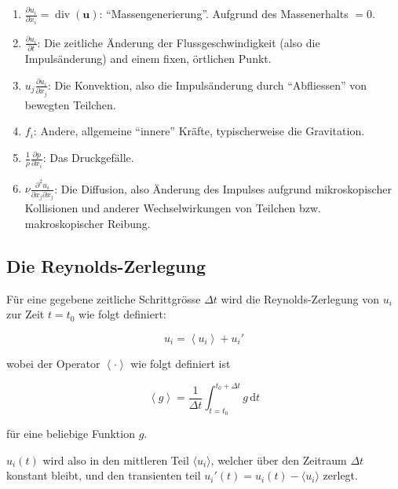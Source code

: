 \begin{enumerate}
    \item $\frac{\partial u_i}{\partial x_i} = \operatorname{div}(\mathbf{u})$: ``Massengenerierung''.
    Aufgrund des Massenerhalts $ = 0$.
    \item $\frac{\partial u_i}{\partial t}$: Die zeitliche Änderung der Flussgeschwindigkeit (also die 
        Impulsänderung) and einem fixen, örtlichen Punkt.
    \item $u_j \frac{\partial u_i}{\partial x_j}$: Die Konvektion, also die Impulsänderung durch ``Abfliessen''
        von bewegten Teilchen.
    \item $f_i$: Andere, allgemeine ``innere'' Kräfte, typischerweise die Gravitation.
    \item $\frac{1}{\rho} \frac{\partial p}{\partial x_i}$: Das Druckgefälle.
    \item $\nu \frac{\partial^2 u_i}{\partial x_j \partial x_j}$: Die Diffusion, also Änderung des Impulses
        aufgrund mikroskopischer Kollisionen und anderer Wechselwirkungen von Teilchen bzw.
        makroskopischer Reibung. %
\end{enumerate}

\subsection{Die Reynolds-Zerlegung}

Für eine gegebene zeitliche Schrittgrösse $\Delta t$ wird die Reynolds-Zerlegung von $u_i$ zur Zeit $t = t_0$
wie folgt definiert:

\newcommand{\ravg}[1]{\left\langle #1 \right\rangle}
\newcommand{\rdecomp}[1]{\ravg{#1} + #1'}

\begin{equation}
    \label{reynolds:eqs:reynolds-decomp}
    u_i = \rdecomp{u_i}
\end{equation}

wobei der Operator $\ravg{\cdot}$ wie folgt definiert ist

\begin{equation}
    \ravg{g} = \frac{1}{\Delta t}\int_{t=t_0}^{t_0 + \Delta t} g \mathrm{\,d}t
\end{equation}

für eine beliebige Funktion $g$.

$u_i(t)$ wird also in den mittleren Teil $\langle u_i \rangle$, welcher über den Zeitraum
$\Delta t$ konstant bleibt, und den transienten teil $u_i'(t) = u_i(t) - \langle u_i \rangle$
zerlegt.

